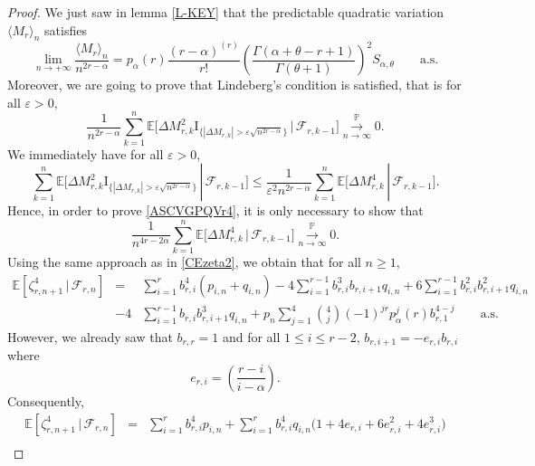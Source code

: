 \documentclass[twoside,12pt]{article}
\newcommand{\dP}{\mathbb{P}}
\newcommand{\rI}{\mathrm{I}}
\newcommand{\E}{\mathds{E}}
\begin{document}
\begin{proof}
We just saw in lemma \ref{L-KEY} that the predictable quadratic variation $\langle M_{r} \rangle_n$ satisfies
\begin{equation}
\label{ASCVGPQVr}
\lim_{n\rightarrow+\infty}\frac{\langle M_{r}\rangle_{n}}{n^{2r-\alpha}}=p_{\alpha}(r)\frac{(r-\alpha)^{(r)}}{r!}\left(\frac{\Gamma(\alpha+\theta-r+1)}{\Gamma(\theta+1)}\right)^{2}S_{\alpha,\theta}\qquad\text{a.s.}
\end{equation}
Moreover, we are going to prove that Lindeberg’s condition is satisfied, that is for all $\varepsilon >0$,
\begin{equation}
\label{ASCVGPQVr4}
\frac{1}{n^{2r-\alpha}}\sum_{k=1}^{n}\E\big[\Delta M_{r,k}^2 \rI_{\{|\Delta M_{r, k}|>\varepsilon \sqrt{n^{2r-\alpha}} \}} \,|\,\mathcal{F}_{r,k-1} \big] \overset{\displaystyle \dP}{\underset{n\to\infty}{\longrightarrow}} 0.
\end{equation}
We immediately have for all $\varepsilon >0$,
$$
\sum_{k=1}^{n}\E\big[\Delta M_{r,k}^2 \rI_{\{|\Delta M_{r, k}|>\varepsilon \sqrt{n^{2r-\alpha}} \}} \,|\,\mathcal{F}_{r,k-1}\big]
\leq 
\frac{1}{\varepsilon^2 n^{2r-\alpha}}\sum_{k=1}^{n}\E\big[\Delta M_{r, k}^4 \,|\,\mathcal{F}_{r,k-1}\big].
$$
Hence, in order to prove \eqref{ASCVGPQVr4}, 
it is only necessary to show that
\begin{equation}
\label{ASCVGPQVr5}
 \frac{1}{n^{4r-2\alpha}}\sum_{k=1}^{n}
\E\big[\Delta M_{r, k}^4 \,|\,\mathcal{F}_{r,k-1} \big] \overset{\displaystyle \dP}{\underset{n\to\infty}{\longrightarrow}} 0.
\end{equation}
Using the same approach as in \eqref{CEzeta2}, we obtain that for all $n \geq 1$,
\begin{eqnarray*}
\E[\zeta_{r,n+1}^4\,|\,\mathcal{F}_{r,n}] &=& \sum_{i=1}^{r}b_{r,i}^4(p_{i,n}+q_{i,n}) -4\sum_{i=1}^{r-1}b_{r,i}^3b_{r,i+1}q_{i,n} +6\sum_{i=1}^{r-1}b_{r,i}^{2}b^{2}_{r,i+1}q_{i,n} \\
&-4&
\sum_{i=1}^{r-1}b_{r,i}b_{r,i+1}^3q_{i,n} +
p_{n}\sum_{j=1}^{4}\binom{4}{j}(-1)^{jr}p_{\alpha}^{j}(r)b_{r,1}^{4-j}
\qquad \text{a.s.} 
\end{eqnarray*}
However, we already saw that $b_{r,r}=1$ and for all $1\leq i \leq r-2$, $b_{r,i+1}= -e_{r,i} b_{r,i}$ where
\begin{equation*}
 e_{r,i}= \left(\frac{r-i}{i-\alpha}\right).
\end{equation*}
Consequently,
\begin{eqnarray*}
\E[\zeta_{r,n+1}^4\,|\,\mathcal{F}_{r,n}] &=& \sum_{i=1}^{r}b_{r,i}^4 p_{i,n}+ \sum_{i=1}^{r}b_{r,i}^4 q_{i,n} \Big(1 + 4e_{r,i} + 6e_{r,i}^2 + 4e_{r,i}^3\Big)\\

\end{eqnarray*}
\end{proof}
\end{document}
